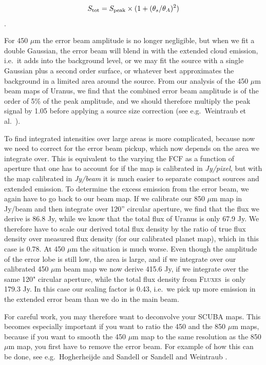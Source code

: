 \documentclass[twoside,11pt]{article}
\newcommand{\fluxes}{\xref{\textsc{Fluxes}}{sun213}{}}
\newcommand{\xref}[3]{#1}
\renewcommand{\_}{\texttt{\symbol{95}}}
\begin{document}
\begin{equation} 
S_{\rm tot} = S_{\rm peak} \times (1 +(\theta_{s}/\theta_{A})^2)   \end{equation}.

For 450 $\mu$m the error beam amplitude is no longer negligible, but
when we fit a double Gaussian, the error beam will blend in with the
extended cloud emission, i.e.\ it adds into the background level, or we
may fit the source with a single Gaussian plus a second order surface,
or whatever best approximates the background in a limited area around
the source.  From our analysis of the 450 $\mu$m beam maps of Uranus,
we find that the combined error beam amplitude is of the order of 5\%
of the peak amplitude, and we should therefore multiply the peak
signal by 1.05 before applying a source size correction (see e.g.\
Weintraub et al.\  \cite{Weintraub99}).


To find integrated intensities over large areas is more complicated,
because now we need to correct for the error beam pickup, which now
depends on the area we integrate over.  This is equivalent to the
varying the FCF as a function of aperture that one has to account for
if the map is calibrated in {\it Jy/pixel}, but with the map
calibrated in {\it Jy/beam} it is much easier to separate compact
sources and extended emission.  To determine the excess emission from
the error beam, we again have to go back to our beam map.  If we
calibrate our 850 $\mu$m map in Jy/beam and then integrate over 120''
circular aperture, we find that the flux we derive is 86.8 Jy, while
we know that the total flux of Uranus is only 67.9 Jy.  We therefore
have to scale our derived total flux density by the ratio of true flux
density over measured flux density (for our calibrated planet map),
which in this case is 0.78.  At 450 $\mu$m the situation is much
worse.  Even though the amplitude of the error lobe is still low, the
area is large, and if we integrate over our calibrated 450 $\mu$m beam
map we now derive 415.6 Jy, if we integrate over the same 120"
circular aperture, while the total flux density from \fluxes\ is only
179.3 Jy.  In this case our scaling factor is 0.43, i.e.\ we pick up
more emission in the extended error beam than we do in the main beam.

For careful work, you may therefore want to deconvolve your SCUBA
maps.  This becomes especially important if you want to ratio the 450
and the 850 $\mu$m maps, because if you want to smooth the 450 $\mu$m
map to the same resolution as the 850 $\mu$m map, you first have to
remove the error beam.  For example of how this can be done, see e.g.\
Hogherheijde and Sandell \cite{Hogherheijde00} or Sandell and
Weintraub \cite{Sandell01}.
\end{document}
